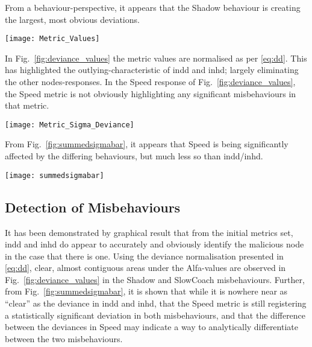 From a behaviour-perspective, it appears that the Shadow behaviour is creating the largest, most obvious deviations.

\begin{figure*}
  \centering
  \texttt{[image: Metric\_Values]}
  \caption{Observed Metric Values for one simulation of each behaviour ($x_{i,j}^{m,t}$ from \eqref{eq:d})}
  \label{fig:metric_values}
\end{figure*}

\begin{comment}
\begin{figure*}
  \centering
  \texttt{[image: Metric\_Deviation]}
  \caption{\emph{Unnecessary but included for draft discussion} Observed Metric Values for one simulation of each behaviour ($d_{i,j}^{m,t}$ from Fig.~\ref{fig:workflow})}
\end{figure*}
\end{comment}

In Fig.~\ref{fig:deviance_values} the metric values are normalised as per \eqref{eq:dd}.
This has highlighted the outlying-characteristic of \gls{indd} and \gls{inhd}; largely eliminating the other nodes-responses.
In the Speed response of Fig.~\ref{fig:deviance_values}, the Speed metric is not obviously highlighting any significant misbehaviours in that metric. 

\begin{figure*}
  \centering
  \texttt{[image: Metric\_Sigma\_Deviance]}
  \caption{Normalised Deviance values from one simulation of each behaviour ($\alpha_{i,j}^{m,t}$ from \eqref{eq:dd})}
  \label{fig:deviance_values}
\end{figure*}

From Fig.~\ref{fig:summedsigmabar}, it appears that Speed is being significantly affected by the differing behaviours, but much less so than \gls{indd}/\gls{inhd}.  

\begin{figure*}
  \centering
  \texttt{[image: summedsigmabar]}
  \caption{Per-Node-Per-Run deviance for each metric, normalised in time ($\sum\alpha/T$)}
  \label{fig:summedsigmabar}
\end{figure*}

\subsection{Detection of Misbehaviours}
It has been demonstrated by graphical result that from the initial metrics set, \gls{indd} and \gls{inhd} do appear to accurately and obviously identify the malicious node in the case that there is one. 
Using the deviance normalisation presented in \eqref{eq:dd}, clear, almost contiguous areas under the Alfa-values are observed in Fig.~\ref{fig:deviance_values} in the Shadow and SlowCoach misbehaviours.
Further, from Fig.~\ref{fig:summedsigmabar}, it is shown that while it is nowhere near as ``clear'' as the deviance in \gls{indd} and \gls{inhd}, that the Speed metric is still registering a statistically significant deviation in both misbehaviours, and that the difference between the deviances in Speed may indicate a way to analytically differentiate between the two misbehaviours.

